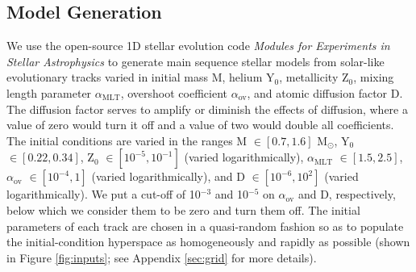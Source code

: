 \documentclass[twocolumn,twocolappendix]{aastex6}
\begin{document}
\subsection{Model Generation}
\label{sec:models}
We use the open-source 1D stellar evolution code \emph{Modules for Experiments in Stellar Astrophysics} \citep[MESA;][]{Paxton2011} to generate main sequence stellar models from solar-like evolutionary tracks varied in initial mass M, helium Y$_0$, metallicity Z$_0$, mixing length parameter $\alpha_{\text{MLT}}$, overshoot coefficient $\alpha_{\text{ov}}$, and atomic diffusion factor D. The diffusion factor serves to amplify or diminish the effects of diffusion, where a value of zero would turn it off and a value of two would double all coefficients. The initial conditions are varied in the ranges M $\in [0.7, 1.6]$ M$_\odot$, Y$_0$ $\in [0.22, 0.34]$, Z$_0$ $\in [10^{-5}, 10^{-1}]$ (varied logarithmically), $\alpha_{\text{MLT}}$ $\in [1.5, 2.5]$, $\alpha_{\text{ov}}$ $\in [10^{-4}, 1]$ (varied logarithmically), and D $\in [10^{-6}, 10^2]$ (varied logarithmically). We put a cut-off of 10$^{-3}$ and 10$^{-5}$ on $\alpha_{\text{ov}}$ and D, respectively, below which we consider them to be zero and turn them off. The initial parameters of each track are chosen in a quasi-random fashion so as to populate the initial-condition hyperspace as homogeneously and rapidly as possible (shown in Figure \ref{fig:inputs}; see Appendix \ref{sec:grid} for more details). %
\end{document}
